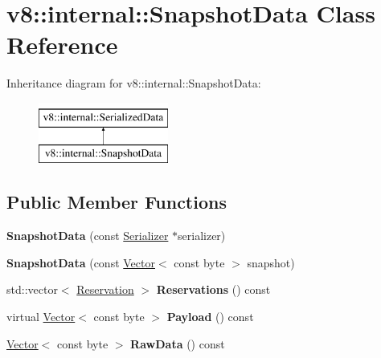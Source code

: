 \hypertarget{classv8_1_1internal_1_1SnapshotData}{}\section{v8\+:\+:internal\+:\+:Snapshot\+Data Class Reference}
\label{classv8_1_1internal_1_1SnapshotData}
Inheritance diagram for v8\+:\+:internal\+:\+:Snapshot\+Data\+:\begin{figure}[H]
\begin{center}
\leavevmode
\includegraphics[height=2.000000cm]{classv8_1_1internal_1_1SnapshotData}
\end{center}
\end{figure}
\subsection*{Public Member Functions}
\begin{DoxyCompactItemize}
\item 
\mbox{\label{classv8_1_1internal_1_1SnapshotData_afa6acd7590bd5c1aa45a55bba609de8a}} 
{\bfseries Snapshot\+Data} (const \mbox{\hyperlink{classv8_1_1internal_1_1Serializer}{Serializer}} $\ast$serializer)
\item 
\mbox{\label{classv8_1_1internal_1_1SnapshotData_a248fcacda06cb9107fa8a4bd762fa400}} 
{\bfseries Snapshot\+Data} (const \mbox{\hyperlink{classv8_1_1internal_1_1Vector}{Vector}}$<$ const byte $>$ snapshot)
\item 
\mbox{\label{classv8_1_1internal_1_1SnapshotData_a2e5f77128f4c7a874e0f2619e1d63fc8}} 
std\+::vector$<$ \mbox{\hyperlink{classv8_1_1internal_1_1SerializedData_1_1Reservation}{Reservation}} $>$ {\bfseries Reservations} () const
\item 
\mbox{\label{classv8_1_1internal_1_1SnapshotData_a74504b78b6a3751fbdc90fb5037133b7}} 
virtual \mbox{\hyperlink{classv8_1_1internal_1_1Vector}{Vector}}$<$ const byte $>$ {\bfseries Payload} () const
\item 
\mbox{\label{classv8_1_1internal_1_1SnapshotData_a278ac1a1ffa805bdc0d71e21339b3a58}} 
\mbox{\hyperlink{classv8_1_1internal_1_1Vector}{Vector}}$<$ const byte $>$ {\bfseries Raw\+Data} () const
\end{DoxyCompactItemize}
